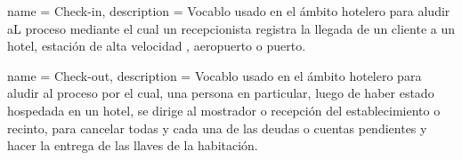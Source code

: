 {
	name = Check-in,
	description = {Vocablo usado en el ámbito hotelero para aludir aL proceso mediante el cual un recepcionista registra la llegada de un cliente a un hotel, estación de alta velocidad , aeropuerto o puerto.}
}

{
	name = Check-out,
	description = {Vocablo usado en el ámbito hotelero para aludir al proceso por el cual, una persona en particular, luego de haber estado hospedada en un hotel, se dirige al mostrador o recepción del establecimiento o recinto, para cancelar todas y cada una de las deudas o cuentas pendientes y hacer la entrega de las llaves de la habitación.}
}